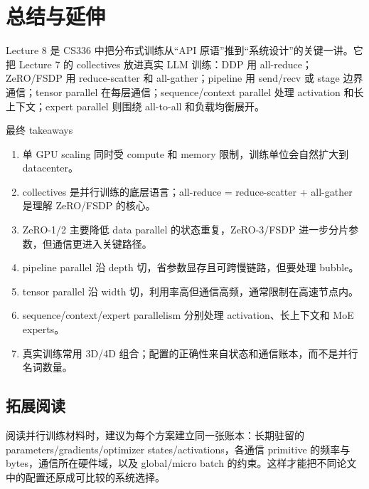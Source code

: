 \section{总结与延伸}

Lecture 8 是 CS336 中把分布式训练从“API 原语”推到“系统设计”的关键一讲。它把 Lecture 7 的 collectives 放进真实 LLM 训练：DDP 用 all-reduce；ZeRO/FSDP 用 reduce-scatter 和 all-gather；pipeline 用 send/recv 或 stage 边界通信；tensor parallel 在每层通信；sequence/context parallel 处理 activation 和长上下文；expert parallel 则围绕 all-to-all 和负载均衡展开。

\begin{importantbox}{最终 takeaways}
\begin{enumerate}
    \item 单 GPU scaling 同时受 compute 和 memory 限制，训练单位会自然扩大到 datacenter。
    \item collectives 是并行训练的底层语言；all-reduce = reduce-scatter + all-gather 是理解 ZeRO/FSDP 的核心。
    \item ZeRO-1/2 主要降低 data parallel 的状态重复，ZeRO-3/FSDP 进一步分片参数，但通信更进入关键路径。
    \item pipeline parallel 沿 depth 切，省参数显存且可跨慢链路，但要处理 bubble。
    \item tensor parallel 沿 width 切，利用率高但通信高频，通常限制在高速节点内。
    \item sequence/context/expert parallelism 分别处理 activation、长上下文和 MoE experts。
    \item 真实训练常用 3D/4D 组合；配置的正确性来自状态和通信账本，而不是并行名词数量。
\end{enumerate}
\end{importantbox}

\subsection{拓展阅读}

阅读并行训练材料时，建议为每个方案建立同一张账本：长期驻留的 parameters/gradients/optimizer states/activations，各通信 primitive 的频率与 bytes，通信所在硬件域，以及 global/micro batch 的约束。这样才能把不同论文中的配置还原成可比较的系统选择。

